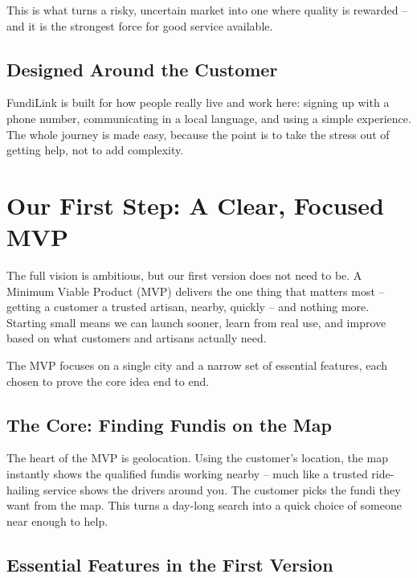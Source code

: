 \documentclass[11pt,a4paper]{article}
\begin{document}
This is what turns a risky, uncertain market into one where quality is rewarded -- and it is
the strongest force for good service available.

\subsection{Designed Around the Customer}

FundiLink is built for how people really live and work here: signing up with a phone number,
communicating in a local language, and using a simple experience. The whole journey is made
easy, because the point is to take the stress out of getting help, not to add complexity.

\section{Our First Step: A Clear, Focused MVP}

The full vision is ambitious, but our first version does not need to be. A Minimum Viable
Product (MVP) delivers the one thing that matters most -- getting a customer a trusted
artisan, nearby, quickly -- and nothing more. Starting small means we can launch sooner, learn
from real use, and improve based on what customers and artisans actually need.

The MVP focuses on a single city and a narrow set of essential features, each chosen to prove
the core idea end to end.

\subsection{The Core: Finding Fundis on the Map}

The heart of the MVP is geolocation. Using the customer's location, the map instantly shows the
qualified fundis working nearby -- much like a trusted ride-hailing service shows the drivers
around you. The customer picks the fundi they want from the map. This turns a day-long search
into a quick choice of someone near enough to help.

\subsection{Essential Features in the First Version}
\end{document}
